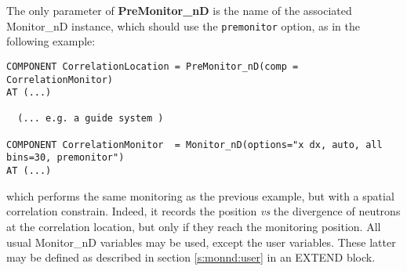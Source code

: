 The only parameter of {\bf PreMonitor\_nD} is the name of the associated Monitor\_nD instance, which should use the \verb+premonitor+ option, as in the following example:
\begin{verbatim}
COMPONENT CorrelationLocation = PreMonitor_nD(comp = CorrelationMonitor)
AT (...)

  (... e.g. a guide system )

COMPONENT CorrelationMonitor  = Monitor_nD(options="x dx, auto, all bins=30, premonitor")
AT (...)
\end{verbatim}
which performs the same monitoring as the previous example, but with a spatial correlation constrain. Indeed, it records the position {\it vs} the divergence of neutrons at the correlation location, but only if they reach the monitoring position. All usual Monitor\_nD variables may be used, except the user variables. These latter may be defined as described in section \ref{s:monnd:user} in an EXTEND block.